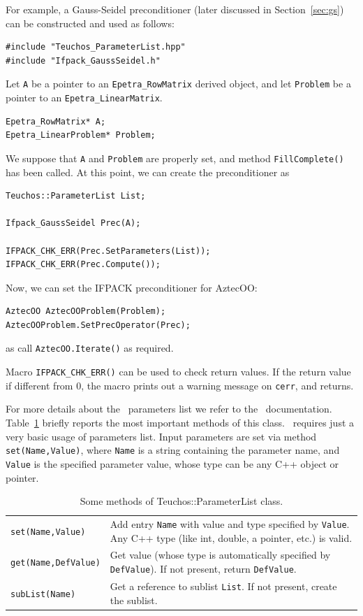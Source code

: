 For example, a Gauss-Seidel preconditioner (later discussed in
Section~\ref{sec:gs}) can be constructed and used as follows:
\begin{verbatim}
#include "Teuchos_ParameterList.hpp"
#include "Ifpack_GaussSeidel.h"
\end{verbatim}
Let \verb!A! be a pointer to an \verb!Epetra_RowMatrix! derived object,
  and let \verb!Problem! be a pointer to an \verb!Epetra_LinearMatrix!.
\begin{verbatim}
Epetra_RowMatrix* A;  
Epetra_LinearProblem* Problem;
\end{verbatim}
We suppose that \verb!A! and 
\verb!Problem! are properly set, and
method \verb~FillComplete()~ has been called. At this point, we can create the
preconditioner as
\begin{verbatim}
Teuchos::ParameterList List;

Ifpack_GaussSeidel Prec(A);

IFPACK_CHK_ERR(Prec.SetParameters(List));
IFPACK_CHK_ERR(Prec.Compute());
\end{verbatim}
Now, we can set the IFPACK preconditioner for AztecOO:
\begin{verbatim}
AztecOO AztecOOProblem(Problem);
AztecOOProblem.SetPrecOperator(Prec);
\end{verbatim}
as call \verb!AztecOO.Iterate()! as required.

Macro \verb!IFPACK_CHK_ERR()! can be used to check return values. If the
return value if different from 0, the macro prints out a warning message on
\verb!cerr!, and returns.

\smallskip

For more details about the \teuchos\ parameters list we refer to the
\teuchos\ documentation.  Table~\ref{tab:teuchos} briefly reports the most
important methods of this class.
\ifpack\ requires just a very basic usage of parameters list.
Input parameters are set via method \verb!set(Name,Value)!, where
\verb!Name! is a string containing the parameter name, and \verb!Value! is the
specified parameter value, whose type can be any C++ object or pointer. 


\begin{table}[htbp]
  \centering
  \begin{tabular}{| p{4cm} | p{10cm} |}
    \hline
    \verb!set(Name,Value)! & Add entry \verb!Name! with value and type
    specified by \verb!Value!. Any C++ type (like int, double, a
    pointer, etc.) is valid. \\
    \verb!get(Name,DefValue)! & Get value (whose type is automatically
    specified by \verb!DefValue!). If not present, return
    \verb!DefValue!. \\
    \verb!subList(Name)! & Get a reference to sublist \verb!List!. If not
    present, create the sublist. \\
    \hline
  \end{tabular}
  \caption{Some methods of Teuchos::ParameterList class.}
  \label{tab:teuchos}
\end{table}

